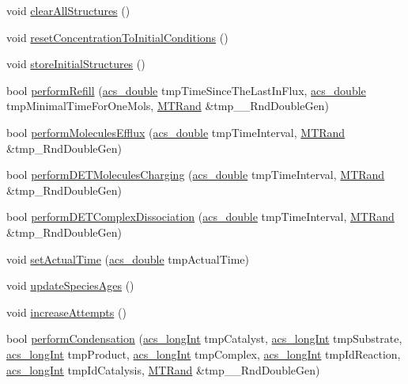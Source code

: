 \begin{DoxyCompactItemize}
\item 
void \hyperlink{a00014_aa860227725dbe5b0251a25f440773161}{clear\-All\-Structures} ()
\item 
void \hyperlink{a00014_a97305e36924f19e72bfc1c3d89e45931}{reset\-Concentration\-To\-Initial\-Conditions} ()
\item 
void \hyperlink{a00014_a7fc3937fb586db93c33f7f091dc99626}{store\-Initial\-Structures} ()
\item 
bool \hyperlink{a00014_a8a53821ad1675b0da50591616aac3b74}{perform\-Refill} (\hyperlink{a00072_ab776853a005fcbf56af0424a2a4dd607}{acs\-\_\-double} tmp\-Time\-Since\-The\-Last\-In\-Flux, \hyperlink{a00072_ab776853a005fcbf56af0424a2a4dd607}{acs\-\_\-double} tmp\-Minimal\-Time\-For\-One\-Mols, \hyperlink{a00016}{M\-T\-Rand} \&tmp\-\_\-\-\_\-\-Rnd\-Double\-Gen)
\item 
bool \hyperlink{a00014_acbbcdb4c77231e9ffa4c169e0caa0d0c}{perform\-Molecules\-Efflux} (\hyperlink{a00072_ab776853a005fcbf56af0424a2a4dd607}{acs\-\_\-double} tmp\-Time\-Interval, \hyperlink{a00016}{M\-T\-Rand} \&tmp\-\_\-\-Rnd\-Double\-Gen)
\item 
bool \hyperlink{a00014_adbaf165a12edd62c614a455544807ea3}{perform\-D\-E\-T\-Molecules\-Charging} (\hyperlink{a00072_ab776853a005fcbf56af0424a2a4dd607}{acs\-\_\-double} tmp\-Time\-Interval, \hyperlink{a00016}{M\-T\-Rand} \&tmp\-\_\-\-Rnd\-Double\-Gen)
\item 
bool \hyperlink{a00014_a6ae793f9d2dca0632239be955dd83cee}{perform\-D\-E\-T\-Complex\-Dissociation} (\hyperlink{a00072_ab776853a005fcbf56af0424a2a4dd607}{acs\-\_\-double} tmp\-Time\-Interval, \hyperlink{a00016}{M\-T\-Rand} \&tmp\-\_\-\-Rnd\-Double\-Gen)
\item 
void \hyperlink{a00014_a9bc445da3e89d09d4fce11c83f3dedb0}{set\-Actual\-Time} (\hyperlink{a00072_ab776853a005fcbf56af0424a2a4dd607}{acs\-\_\-double} tmp\-Actual\-Time)
\item 
void \hyperlink{a00014_adab0607255ca5927b69cb6882917e031}{update\-Species\-Ages} ()
\item 
void \hyperlink{a00014_aac3eed768b89e3a70017075b68046ede}{increase\-Attempts} ()
\item 
bool \hyperlink{a00014_a1baf5512b7e0a8fb6f8f890ba9f99cd1}{perform\-Condensation} (\hyperlink{a00072_a19319d75f02db4308bc5c0026d98cd85}{acs\-\_\-long\-Int} tmp\-Catalyst, \hyperlink{a00072_a19319d75f02db4308bc5c0026d98cd85}{acs\-\_\-long\-Int} tmp\-Substrate, \hyperlink{a00072_a19319d75f02db4308bc5c0026d98cd85}{acs\-\_\-long\-Int} tmp\-Product, \hyperlink{a00072_a19319d75f02db4308bc5c0026d98cd85}{acs\-\_\-long\-Int} tmp\-Complex, \hyperlink{a00072_a19319d75f02db4308bc5c0026d98cd85}{acs\-\_\-long\-Int} tmp\-Id\-Reaction, \hyperlink{a00072_a19319d75f02db4308bc5c0026d98cd85}{acs\-\_\-long\-Int} tmp\-Id\-Catalysis, \hyperlink{a00016}{M\-T\-Rand} \&tmp\-\_\-\-\_\-\-Rnd\-Double\-Gen)

\end{DoxyCompactItemize}
